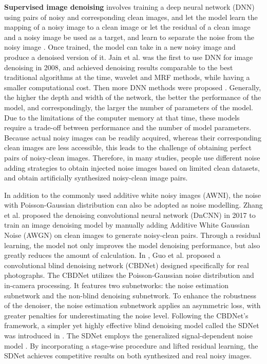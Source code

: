 \documentclass[conference]{IEEEtran}
\begin{document}
{\bf Supervised image denoising} involves training a deep neural network (DNN) using pairs of noisy and corresponding clean images, and let the model learn the mapping of a noisy image to a clean image \cite{zhang2018ffdnet, guo2019toward, kim2020transfer, liu2019multi, park2019densely, chen2022simple, yue2020dual, xie2012image} or let the residual of a clean image and a noisy image be used as a target, and learn to separate the noise from the noisy image \cite{zhang2017beyond, anwar2019real, chang2020spatial}. Once trained, the model can take in a new noisy image and produce a denoised version of it. Jain et al. \cite{jain2008natural} was the first to use DNN for image denoising in 2008, and achieved denoising results comparable to the best traditional algorithms at the time, wavelet and MRF methods\cite{li1994markov, chen2007spatio}, while having a smaller computational cost. Then more DNN methods were proposed \cite{zhang2018ffdnet, vaksman2021patch, xie2012image, dong2018denoising, agostinelli2013adaptive}. Generally, the higher the depth and width of the network, the better the performance of the model, and correspondingly, the larger the number of parameters of the model. Due to the limitations of the computer memory at that time, these models require a trade-off between performance and the number of model parameters. Because actual noisy images can be readily acquired, whereas their corresponding clean images are less accessible, this leads to the challenge of obtaining perfect pairs of noisy-clean images. Therefore, in many studies, people use different noise adding strategies to obtain injected noise images based on limited clean datasets, and obtain artificially synthesized noisy-clean image pairs.

In addition to the commonly used additive white noisy images (AWNI), the noise with Poisson-Gaussian distribution can also be adopted as noise modelling. Zhang et al. \cite{zhang2017beyond} proposed the denoising convolutional neural network (DnCNN) in 2017 to train an image denoising model by manually adding Additive White Gaussian Noise (AWGN) on clean images to generate noisy-clean pairs. Through a residual learning, the model not only improves the model denoising performance, but also greatly reduces the amount of calculation. In \cite{guo2019toward}, Guo et al. proposed a convolutional blind denoising network (CBDNet) designed specifically for real photographs. The CBDNet utilizes the Poisson-Gaussian noise distribution and in-camera processing. It features two subnetworks: the noise estimation subnetwork and the non-blind denoising subnetwork. To enhance the robustness of the denoiser, the noise estimation subnetwork applies an asymmetric loss, with greater penalties for underestimating the noise level. Following the CBDNet's framework, a simpler yet highly effective blind denoising model called the SDNet was introduced in \cite{zhao2019simple}. The SDNet employs the generalized signal-dependent noise model \cite{liu2014practical}. By incorporating a stage-wise procedure and lifted residual learning, the SDNet achieves competitive results on both synthesized and real noisy images.
\end{document}
